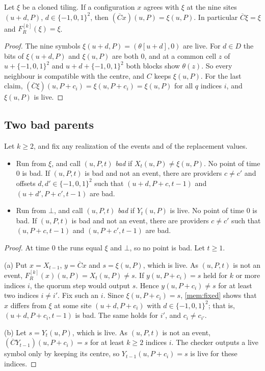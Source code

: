 \begin{lemma}\label{mem:fixed}
Let $\xi$ be a cloned tiling. If a configuration $x$ agrees with $\xi$ at the nine sites $(u+d,P)$, $d\in\{-1,0,1\}^2$, then $(\overline Cx)(u,P)=\xi(u,P)$. In particular $\overline C\xi=\xi$ and $F^{[k]}_R(\xi)=\xi$.
\end{lemma}

\begin{proof}
The nine symbols $\xi(u+d,P)=(\theta[u+d],0)$ are live. For $d\in D$ the bits of $\xi(u+d,P)$ and $\xi(u,P)$ are both $0$, and at a common cell $z$ of $u+\{-1,0,1\}^2$ and $u+d+\{-1,0,1\}^2$ both blocks show $\theta(z)$. So every neighbour is compatible with the centre, and $C$ keeps $\xi(u,P)$. For the last claim, $(\overline C\xi)(u,P+c_i)=\xi(u,P+c_i)=\xi(u,P)$ for all $q$ indices $i$, and $\xi(u,P)$ is live.
\end{proof}

\subsection{Two bad parents}\label{mem:parents}

\begin{lemma}\label{mem:two-parents}
Let $k\ge2$, and fix any realization of the events and of the replacement values.
\begin{itemize}
\item[(a)] Run from $\xi$, and call $(u,P,t)$ \emph{bad} if $X_t(u,P)\ne\xi(u,P)$. No point of time $0$ is bad. If $(u,P,t)$ is bad and not an event, there are providers $c\ne c'$ and offsets $d,d'\in\{-1,0,1\}^2$ such that $(u+d,P+c,t-1)$ and $(u+d',P+c',t-1)$ are bad.
\item[(b)] Run from $\bot$, and call $(u,P,t)$ \emph{bad} if $Y_t(u,P)$ is live. No point of time $0$ is bad. If $(u,P,t)$ is bad and not an event, there are providers $c\ne c'$ such that $(u,P+c,t-1)$ and $(u,P+c',t-1)$ are bad.
\end{itemize}
\end{lemma}

\begin{proof}
At time $0$ the runs equal $\xi$ and $\bot$, so no point is bad. Let $t\ge1$.

(a) Put $x=X_{t-1}$, $y=\overline Cx$ and $s=\xi(u,P)$, which is live. As $(u,P,t)$ is not an event, $F^{[k]}_R(x)(u,P)=X_t(u,P)\ne s$. If $y(u,P+c_i)=s$ held for $k$ or more indices $i$, the quorum step would output $s$. Hence $y(u,P+c_i)\ne s$ for at least two indices $i\ne i'$. Fix such an $i$. Since $\xi(u,P+c_i)=s$, \cref{mem:fixed} shows that $x$ differs from $\xi$ at some site $(u+d,P+c_i)$ with $d\in\{-1,0,1\}^2$; that is, $(u+d,P+c_i,t-1)$ is bad. The same holds for $i'$, and $c_i\ne c_{i'}$.

(b) Let $s=Y_t(u,P)$, which is live. As $(u,P,t)$ is not an event, $(\overline CY_{t-1})(u,P+c_i)=s$ for at least $k\ge2$ indices $i$. The checker outputs a live symbol only by keeping its centre, so $Y_{t-1}(u,P+c_i)=s$ is live for these indices.
\end{proof}

